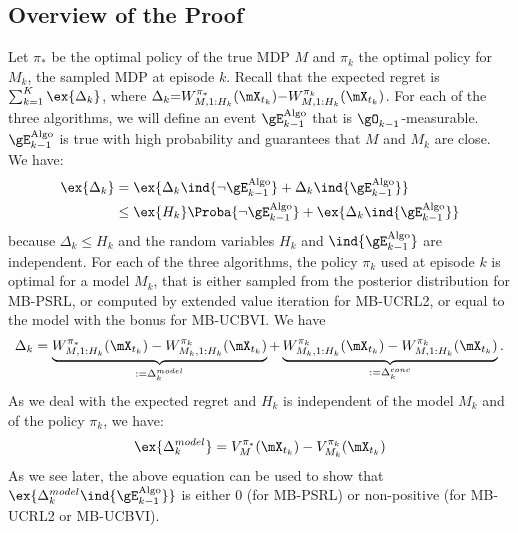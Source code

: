 \subsection{Overview of the Proof}
\label{ssec:overview}

Let $\pi_*$ be the optimal policy of the true MDP $M$ and $\pi_k$ the optimal policy for $M_k$, the sampled MDP at episode $k$. Recall that the expected regret is $\sum_{k=1}^K \ex{\Delta_k}$, where $\Delta_k {=} W_{M,1:H_k}^{\pi_*}(\mX_{t_k}) {-} W_{M,1:H_k}^{\pi_k}(\mX_{t_k})$.
For each of the three algorithms, we will define an event $\gE^\text{Algo}_{k-1}$ that is $\gO_{k-1}$-measurable. $\gE^\text{Algo}_{k-1}$ is true with high probability and guarantees that $M$ and $M_k$ are close.
We have:
\begin{align}
    \ex{\Delta_k}
    &= \ex{\Delta_k\ind{\lnot\gE_{k-1}^\text{Algo}} +\Delta_k\ind{\gE_{k-1}^\text{Algo}} } \nonumber\\
    &\le \ex{H_k}\Proba{\lnot\gE_{k-1}^\text{Algo}} + \ex{\Delta_k \ind{\gE_{k-1}^\text{Algo}}} \label{eq:gap_overview}
\end{align}
because $\Delta_k\le H_k$ and the random variables $H_k$ and $\ind{\gE_{k-1}^\text{Algo}}$ are independent.
For each of the three algorithms, the policy $\pi_k$ used at episode $k$ is optimal for a model $M_k$, that is either sampled from the posterior distribution for MB-PSRL, or computed by extended value iteration for MB-UCRL2, or equal to the model with the bonus for MB-UCBVI. We have
\begin{align*}
    \Delta_k=\underbrace{W_{M,1:H_k}^{\pi_*}(\mX_{t_k}) - W_{M_k,1:H_k}^{\pi_k}(\mX_{t_k})}_{:=\Delta^{model}_k}%
    + \underbrace{W_{M_k,1:H_k}^{\pi_k}(\mX_{t_k}) - W_{M,1:H_k}^{\pi_k}(\mX_{t_k})}_{:=\Delta^{conc}_k}.
\end{align*}
As we deal with the expected regret and $H_k$ is independent of the model $M_k$ and of the policy $\pi_k$, we have:
\begin{align}
    \ex{\Delta^{model}_k} = V_{M}^{\pi_*}(\mX_{t_k}) - V_{M_k}^{\pi_k}(\mX_{t_k}) \label{eq:def_model}
\end{align}
As we see later, the above equation can be used to show that $\ex{\Delta^{model}_k \ind{\gE_{k-1}^\text{Algo}}}$ is either $0$ (for MB-PSRL) or non-positive (for MB-UCRL2 or MB-UCBVI). 


